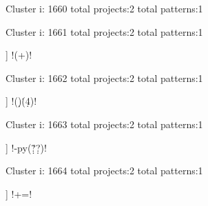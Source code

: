 Cluster i: 1660
total projects:2
total patterns:1
\begin{multicols}{1}
\end{multicols}







Cluster i: 1661
total projects:2
total patterns:1
\begin{multicols}{1}
\begin{description}[noitemsep,topsep=0pt]
\item [[2] ] \cverb!(\w+)\s*\(\)!
\end{description}
\end{multicols}







Cluster i: 1662
total projects:2
total patterns:1
\begin{multicols}{1}
\begin{description}[noitemsep,topsep=0pt]
\item [[2] ] \cverb!(\d)\.(\d{4})!
\end{description}
\end{multicols}







Cluster i: 1663
total projects:2
total patterns:1
\begin{multicols}{1}
\begin{description}[noitemsep,topsep=0pt]
\item [[2] ] \cverb!-py(\d\.?\d?)!
\end{description}
\end{multicols}







Cluster i: 1664
total projects:2
total patterns:1
\begin{multicols}{1}
\begin{description}[noitemsep,topsep=0pt]
\item [[2] ] \cverb!\s*[^\s]+\s*=!
\end{description}
\end{multicols}







